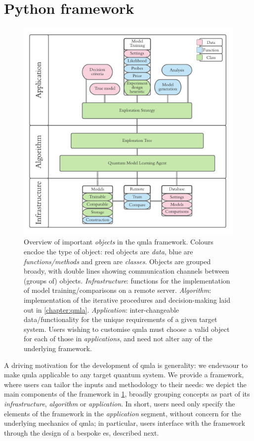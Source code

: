 \section{Python framework}
\begin{figure}
    \includegraphics{algorithms/figures/software_overview.pdf}
    \caption[  codebase overview]{
        Overview of important \emph{objects} in the \gls{qmla} framework.
        Colours encdoe the type of object: red objects are \emph{data}, blue are \emph{functions/methods} 
        and green are \emph{classes}. 
        Objects are grouped broady, with double lines showing communication channels between (groups of) objects. 
        \emph{Infrastructure}: functions for the implementation of model training/comparisons on 
        a remote server.
        \emph{Algorithm}: implementation of the iterative procedures and decision-making 
        laid out in \cref{chapter:qmla}. 
        \emph{Application}: inter-changeable data/functionality for the unique requirements 
        of a given target system. 
        Users wishing to customise \gls{qmla} must choose a valid object for each of those in \emph{applications}, 
            and need not alter any of the underlying framework.
    }
    \label{fig:software_overview}
\end{figure}

A driving motivation for the development of \gls{qmla} is generality:
    we endevaour to make \gls{qmla} applicable to any target quantum system.
We provide a framework, where users can tailor the inputs and methodology to their needs:
    we depict the main components of the framework in \cref{fig:software_overview}, 
    broadly grouping concepts as part of its \emph{infrastructure}, \emph{algorithm}
    or \emph{application}. 
In short, users need only specify the elements of the framework in the \emph{application} segment, 
    without concern for the underlying mechanics of \gls{qmla}; 
    in particular, users interface with the framework through the design of a bespoke \gls{es}, described next. 


